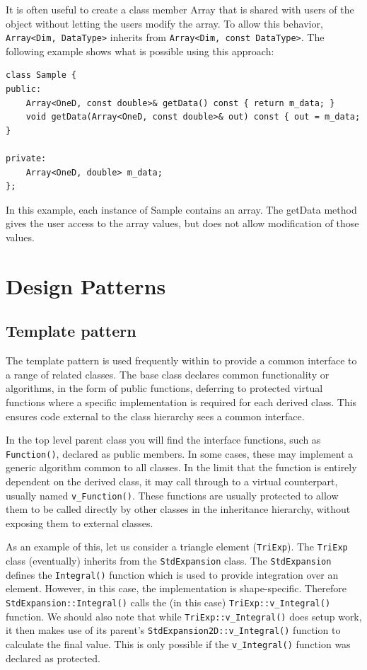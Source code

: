 It is often useful to create a class member Array that is shared with users of
the object without letting the users modify the array. To allow this behavior,
\lstinline{Array<Dim, DataType>} inherits from 
\lstinline{Array<Dim, const DataType>}. The following
example shows what is possible using this approach:
\begin{lstlisting}
class Sample {
public:
    Array<OneD, const double>& getData() const { return m_data; }
    void getData(Array<OneD, const double>& out) const { out = m_data; }

private:
    Array<OneD, double> m_data;
};
\end{lstlisting}
In this example, each instance of Sample contains an array. The getData
method gives the user access to the array values, but does not allow
modification of those values.



\section{Design Patterns}
\subsection{Template pattern}
\label{s:template-pattern}
The template pattern is used frequently within {\nek} to provide a common interface to a range of related classes. The base class declares common functionality or algorithms, in the form of public functions, deferring to protected virtual functions where a specific implementation is required for each derived class. This ensures code external to the class hierarchy sees a common interface.

In the top level parent class you will find the interface functions, such as
\lstinline{Function()}, declared as public members. In some cases, these may implement a generic algorithm common to all classes. In the limit that the function is entirely dependent on the derived class, it may call through to a virtual counterpart, usually named \lstinline{v_Function()}. These functions are usually protected to allow them to be called directly by other classes in the inheritance hierarchy, without exposing them to external classes.

As an example of this, let us consider a triangle
element (\lstinline{TriExp}).  The \lstinline{TriExp} class (eventually) inherits from the \lstinline{StdExpansion} class.  The \lstinline{StdExpansion} defines the \lstinline{Integral()} function which is used to provide integration over an element.  However, in this case, the implementation is shape-specific. Therefore \lstinline{StdExpansion::Integral()} calls the (in this case) \lstinline{TriExp::v_Integral()} function.  We should also note that while \lstinline{TriExp::v_Integral()} does setup work, it then makes use of its parent's \lstinline{StdExpansion2D::v_Integral()} function to calculate the final value. This is only possible if the \lstinline{v_Integral()} function was declared as protected.

